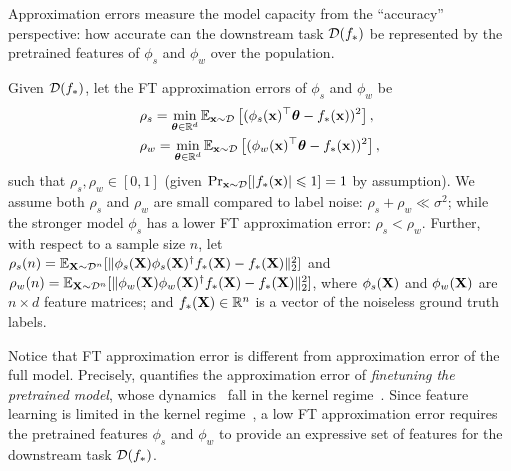 Approximation errors measure the model capacity from the ``accuracy'' perspective: how accurate can the downstream task $\mathcal{D}(f_*)$ be represented by the pretrained features of $\phi_s$ and $\phi_w$ over the population.
\begin{definition}\label{def:ft_est_err}
   Given $\mathcal{D}(f_*)$, let the FT approximation errors of $\phi_s$ and $\phi_w$ be
    \begin{align*}
        &\rho_s = \min_{\boldsymbol{\theta} \in \mathbb{R}^d} \mathbb{E}_{\mathbf{x} \sim \mathcal{D}}\left[(\phi_s(\mathbf{x})^\top \boldsymbol{\theta} - f_*(\mathbf{x}))^2\right], \\
        &\rho_w = \min_{\boldsymbol{\theta} \in \mathbb{R}^d} \mathbb{E}_{\mathbf{x} \sim \mathcal{D}}\left[(\phi_w(\mathbf{x})^\top \boldsymbol{\theta} - f_*(\mathbf{x}))^2\right],
    \end{align*}
    such that $\rho_s, \rho_w \in [0,1]$ (given $\Pr_{\mathbf{x} \sim \mathcal{D}}[|f_*(\mathbf{x})| \leqslant 1]=1$ by assumption). 
    We assume both $\rho_s$ and $\rho_w$ are small compared to label noise: $\rho_s + \rho_w \ll \sigma^2$; while the stronger model $\phi_s$ has a lower FT approximation error: $\rho_s < \rho_w$.
    Further, with respect to a sample size $n$, let $\rho_s(n) = \mathbb{E}_{\mathbf{X} \sim \mathcal{D}^n}[\| \phi_s(\mathbf{X}) \phi_s(\mathbf{X})^\dagger f_*(\mathbf{X}) - f_*(\mathbf{X}) \|_2^2]$ and $\rho_w(n) = \mathbb{E}_{\mathbf{X} \sim \mathcal{D}^n}[\| \phi_w(\mathbf{X}) \phi_w(\mathbf{X})^\dagger f_*(\mathbf{X}) - f_*(\mathbf{X}) \|_2^2]$, where $\phi_s(\mathbf{X})$ and $\phi_w(\mathbf{X})$ are $n \times d$ feature matrices; and $f_*(\mathbf{X}) \in \mathbb{R}^n$ is a vector of the noiseless ground truth labels.
\end{definition}
Notice that FT approximation error is different from approximation error of the full model. Precisely,  quantifies the approximation error of \emph{finetuning the pretrained model}, whose dynamics~\citep{wei2022more,malladi2023kernel} fall in the kernel regime~\citep{jacot2018neural}. 
Since feature learning is limited in the kernel regime~\citep{woodworth2020kernel}, a low FT approximation error requires the pretrained features $\phi_s$ and $\phi_w$ to provide an expressive set of features for the downstream task $\mathcal{D}(f_*)$.

